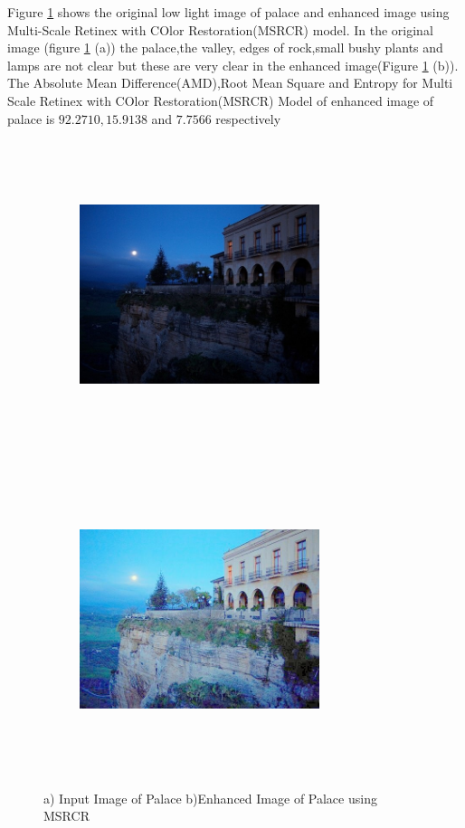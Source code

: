 Figure \ref{fig:msrcrPalace} shows the original low light image of palace and enhanced image using Multi-Scale Retinex with COlor Restoration(MSRCR) model. In the original image (figure \ref{fig:msrcrPalace} (a))  the palace,the valley, edges of rock,small bushy plants and lamps are not clear but these are very clear in the enhanced image(Figure \ref{fig:msrcrPalace} (b)). The Absolute Mean Difference(AMD),Root Mean Square and Entropy for Multi Scale Retinex with COlor Restoration(MSRCR) Model of enhanced image of palace is $92.2710, 15.9138$ and $7.7566$ respectively      

\begin{figure}
	\begin{subfigure}{8cm}
		\centering    
    	\includegraphics[width=7cm,height=9cm,keepaspectratio]{images/ch5/palace_input.jpg}
    	\caption{} 
    \end{subfigure}
  	\begin{subfigure}{6cm}
  		\centering
  		\includegraphics[width=7cm,height=9cm,keepaspectratio]{images/ch5/palace_msrcr.jpg}
   		\caption{}
  	\end{subfigure}
  	\caption{a) Input Image of Palace b)Enhanced Image of Palace using MSRCR}
  	\label{fig:msrcrPalace}
\end{figure}



